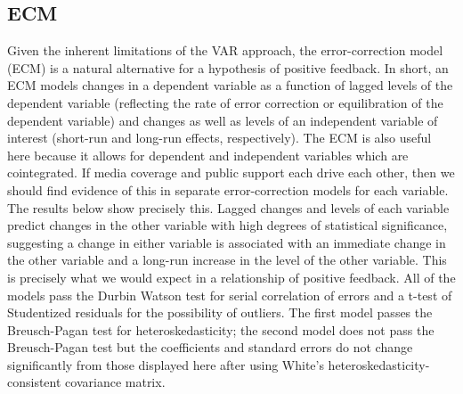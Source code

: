 \documentclass[12pt,article]{article}
\begin{document}
\subsection{ECM}\label{ecm}

Given the inherent limitations of the VAR approach, the error-correction
model (ECM) is a natural alternative for a hypothesis of positive
feedback. In short, an ECM models changes in a dependent variable as a
function of lagged levels of the dependent variable (reflecting the rate
of error correction or equilibration of the dependent variable) and
changes as well as levels of an independent variable of interest
(short-run and long-run effects, respectively). The ECM is also useful
here because it allows for dependent and independent variables which are
cointegrated. If media coverage and public support each drive each
other, then we should find evidence of this in separate error-correction
models for each variable. The results below show precisely this. Lagged
changes and levels of each variable predict changes in the other
variable with high degrees of statistical significance, suggesting a
change in either variable is associated with an immediate change in the
other variable and a long-run increase in the level of the other
variable. This is precisely what we would expect in a relationship of
positive feedback. All of the models pass the Durbin Watson test for
serial correlation of errors and a t-test of Studentized residuals for
the possibility of outliers. The first model passes the Breusch-Pagan
test for heteroskedasticity; the second model does not pass the
Breusch-Pagan test but the coefficients and standard errors do not
change significantly from those displayed here after using White's
heteroskedasticity-consistent covariance matrix.
\end{document}
